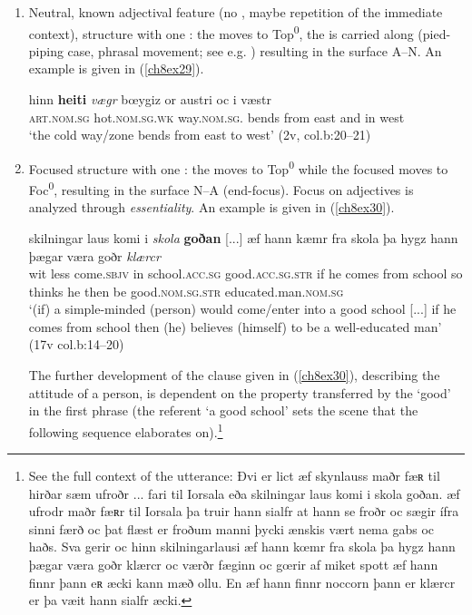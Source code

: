 \documentclass[output=paper,colorlinks,citecolor=brown]{langscibook}
\begin{document}
\begin{enumerate}[label=\alph*.]
\item Neutral, known adjectival feature (no , maybe repetition of
the immediate context), structure with one : the  moves to
Top\textsuperscript{0}, the  is carried along (pied-piping case, phrasal
movement; see e.g. \citealp{Cinque2010}) resulting in the surface  A--N.
An example is given in (\ref{ch8ex29}).

\begin{exe}
\ex\label{ch8ex29}
\gll hinn \textbf{heiti} \textit{vægr} bœygiz or austri oc i væstr \\
\textsc{art.nom.sg} hot.\textsc{nom.sg.wk} way.\textsc{nom.sg.} bends from east and in west\\
\glt `the cold way/zone bends from east to west' (2v, col.b:20--21)
\end{exe}

\item Focused structure with one : the  moves to Top\textsuperscript{0} while
the focused  moves to Foc\textsuperscript{0}, resulting in the surface 
N--A (end-focus). Focus on adjectives is analyzed through
\emph{essentiality}. An example is given in (\ref{ch8ex30}).

\begin{exe}
\ex\label{ch8ex30}
\gll  skilningar laus komi i {\textit{skola}} \textbf{goðan } [...] æf hann kæmr fra skola þa hygz hann þægar væra goðr \emph{klærcr} \\
wit less come.\textsc{sbjv} in school.\textsc{acc.sg} good.\textsc{acc.sg.str} {} if he comes from school so thinks he then be good.\textsc{nom.sg.str} educated.man.\textsc{nom.sg}\\
\glt `(if) a simple-minded (person) would come/enter into a good school [...]  if he comes from school then (he) believes (himself) to be a well-educated man'  (17v col.b:14--20)
\end{exe}

The further development of the clause given in (\ref{ch8ex30}), describing the
attitude of a person, is dependent on the property transferred by the
 `good' in the first phrase (the referent `a good school' sets
the scene that the following sequence elaborates on).\footnote{See
  the full context of the utterance: Ðvi er lict æf skynlauss maðr fæʀ
  til hirðar sæm ufroðr ... fari til Iorsala eða skilningar laus komi i
  skola goðan. æf ufrodr maðr fæʀr til Iorsala þa truir hann sialfr at
  hann se froðr oc sægir ífra sinni færð oc þat flæst er froðum manni
  þycki ænskis vært nema gabs oc haðs. Sva gerir oc hinn skilningarlausi
  æf hann kœmr fra skola þa hygz hann þægar væra goðr klærcr oc værðr
  fæginn oc gœrir af miket spott æf hann finnr þann eʀ æcki kann mæð
  ollu. En æf hann finnr noccorn þann er klærcr er þa væit hann sialfr
  æcki.

}
\end{enumerate}
\end{document}
